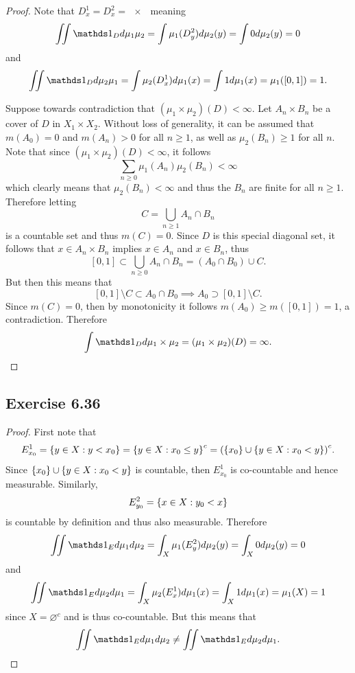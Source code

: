 \documentclass[hw_all.tex]{subfiles}
\begin{document}
\begin{proof}
    Note that $D_x^1 = D_x^2 = \qty{x}$ meaning
    \[
        \iint \ind{D} d \mu_1 \mu_2 = \int \mu_1(D_y^2) d \mu_2(y) = \int 0 d \mu_2(y) = 0
    \]
    and
    \[
        \iint \ind{D} d \mu_2 \mu_1 = \int \mu_2(D_x^1) d \mu_1(x) = \int 1 d \mu_1(x) = \mu_1([0,1]) = 1
    .\]

    Suppose towards contradiction that $(\mu_1 \times \mu_2)(D) < \infty$. Let $A_n \times B_n$ be a cover of $D$ in $X_1 \times X_2$. Without loss of generality, it can be assumed that $m(A_0) = 0$ and $m(A_n) > 0$ for all $n \geq 1$, as well as $\mu_2(B_n) \geq 1$ for all $n$. Note that since $(\mu_1 \times \mu_2)(D) < \infty$, it follows
    \[
        \sum_{n \geq 0} \mu_1(A_n) \mu_2(B_n) < \infty
    \]
    which clearly means that $\mu_2(B_n) < \infty$ and thus the $B_n$ are finite for all $n \geq 1$. Therefore letting
    \[
        C = \bigcup_{n \geq 1} A_n \cap B_n
    \]
    is a countable set and thus $m(C) = 0$. Since $D$ is this special diagonal set, it follows that $x \in A_n \times B_n$ implies $x \in A_n$ and $x \in B_n$, thus
    \[
        [0,1] \subset \bigcup_{n \geq 0} A_n \cap B_n = (A_0 \cap B_0) \cup C
    .\]
    But then this means that
    \[
        [0,1] \setminus C \subset A_0 \cap B_0 \implies A_0 \supset [0,1] \setminus C
    .\]
    Since $m(C) = 0$, then by monotonicity it follows $m(A_0) \geq m([0,1]) = 1$, a contradiction. Therefore 
    \[
        \int \ind{D} d \mu_1 \times \mu_2 = (\mu_1 \times \mu_2)(D) = \infty
    .\]
\end{proof}

\subsection{Exercise 6.36}

\begin{proof}
    First note that
    \[
        E_{x_0}^1 = \qty{y \in X : y < x_0} = \qty{y \in X : x_0 \leq y}^c = \qty(\qty{x_0} \cup \qty{y \in X : x_0 < y})^c
    .\]
    Since $\qty{x_0} \cup \qty{y \in X : x_0 < y}$ is countable, then $E_{x_0}^1$ is co-countable and hence measurable. Similarly,
    \[
        E_{y_0}^2 = \qty{x \in X : y_0 < x}
    \]
    is countable by definition and thus also measurable. Therefore
    \[
        \iint \ind{E} d \mu_1 d \mu_2 = \int_X \mu_1(E_y^2) d \mu_2(y) = \int_X 0 d \mu_2(y) = 0
    \]
    and
    \[
        \iint \ind{E} d \mu_2 d \mu_1 = \int_X \mu_2(E_x^1) d \mu_1(x) = \int_X 1 d \mu_1(x) = \mu_1(X) = 1
    \]
    since $X = \varnothing^c$ and is thus co-countable. But this means that
    \[
        \iint \ind{E} d \mu_1 d \mu_2 \neq \iint \ind{E} d \mu_2 d \mu_1
    .\]
\end{proof}
\end{document}
